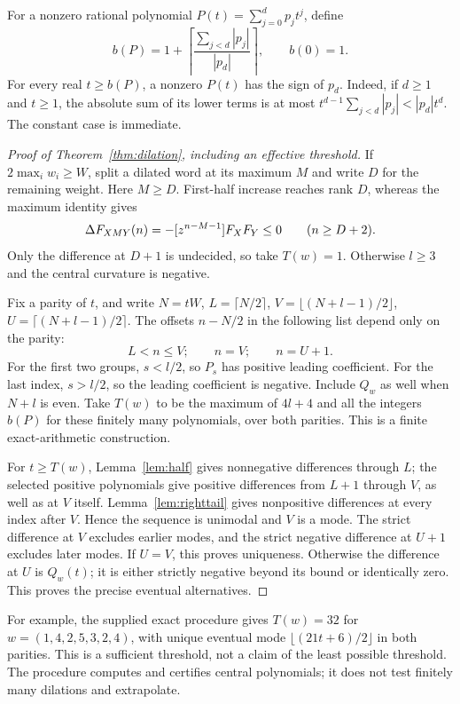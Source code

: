 For a nonzero rational polynomial $P(t)=\sum_{j=0}^d p_jt^j$, define
\[
 b(P)=1+\left\lceil\frac{\sum_{j<d}|p_j|}{|p_d|}\right\rceil,
 \qquad b(0)=1.
\]
For every real $t\ge b(P)$, a nonzero $P(t)$ has the sign of $p_d$.
Indeed, if $d\ge1$ and $t\ge1$, the absolute sum of its lower terms
is at most $t^{d-1}\sum_{j<d}|p_j|<|p_d|t^d$.
The constant case is immediate.

\begin{proof}[Proof of Theorem~\ref{thm:dilation}, including an effective threshold]
If $2\max_iw_i\ge W$, split a dilated word at its maximum $M$ and
write $D$ for the remaining weight. Here $M\ge D$. First-half
increase reaches rank $D$, whereas the maximum identity gives
\[
 \Delta F_{XMY}(n)=-[z^{n-M-1}]F_XF_Y\le0
 \qquad(n\ge D+2).
\]
Only the difference at $D+1$ is undecided, so take $T(w)=1$.
Otherwise $l\ge3$ and the central curvature is negative.

Fix a parity of $t$, and write $N=tW$, $L=\lceil N/2\rceil$,
$V=\lfloor(N+l-1)/2\rfloor$, $U=\lceil(N+l-1)/2\rceil$.
The offsets $n-N/2$ in the following list depend only on the parity:
\[
 L<n\le V;\qquad n=V;\qquad n=U+1.
\]
For the first two groups, $s<l/2$, so $P_s$ has positive leading
coefficient. For the last index, $s>l/2$, so the leading coefficient
is negative. Include $Q_w$ as well when $N+l$ is even.
Take $T(w)$ to be the maximum of $4l+4$ and all the integers $b(P)$
for these finitely many polynomials, over both parities.
This is a finite exact-arithmetic construction.

For $t\ge T(w)$, Lemma~\ref{lem:half} gives nonnegative differences
through $L$; the selected positive polynomials give positive
differences from $L+1$ through $V$, as well as at $V$ itself.
Lemma~\ref{lem:righttail} gives nonpositive differences at every
index after $V$. Hence the sequence is unimodal and $V$ is a mode.
The strict difference at $V$ excludes earlier modes, and the strict
negative difference at $U+1$ excludes later modes.
If $U=V$, this proves uniqueness. Otherwise the difference at $U$
is $Q_w(t)$; it is either strictly negative beyond its bound or
identically zero. This proves the precise eventual alternatives.
\end{proof}

For example, the supplied exact procedure gives $T(w)=32$ for
$w=(1,4,2,5,3,2,4)$, with unique eventual mode
$\lfloor(21t+6)/2\rfloor$ in both parities. This is a sufficient
threshold, not a claim of the least possible threshold.
The procedure computes and certifies central polynomials; it does not
test finitely many dilations and extrapolate.

